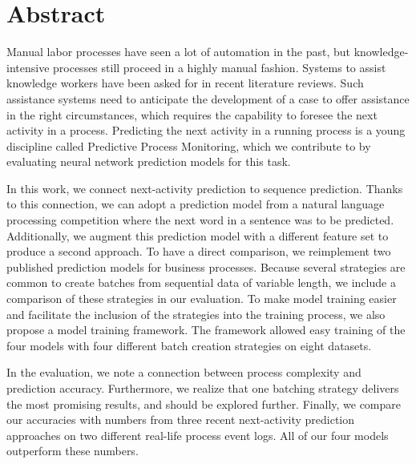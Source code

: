 


\begingroup
\let\clearpage\relax
\let\cleardoublepage\relax
\let\cleardoublepage\relax

\chapter*{Abstract}
Manual labor processes have seen a lot of automation in the past, but knowledge-intensive processes still proceed in a highly manual fashion.
Systems to assist knowledge workers have been asked for in recent literature reviews.
Such assistance systems need to anticipate the development of a case to offer assistance in the right circumstances, which requires the capability to foresee the next activity in a process.
Predicting the next activity in a running process is a young discipline called Predictive Process Monitoring, which we contribute to by evaluating neural network prediction models for this task.

In this work, we connect next-activity prediction to sequence prediction.
Thanks to this connection, we can adopt a prediction model from a natural language processing competition where the next word in a sentence was to be predicted.
Additionally, we augment this prediction model with a different feature set to produce a second approach.
To have a direct comparison, we reimplement two published prediction models for business processes.
Because several strategies are common to create batches from sequential data of variable length, we include a comparison of these strategies in our evaluation.
To make model training easier and facilitate the inclusion of the strategies into the training process, we also propose a model training framework.
The framework allowed easy training of the four models with four different batch creation strategies on eight datasets.

In the evaluation, we note a connection between process complexity and prediction accuracy.
Furthermore, we realize that one batching strategy delivers the most promising results, and should be explored further.
Finally, we compare our accuracies with numbers from three recent next-activity prediction approaches on two different real-life process event logs.
All of our four models outperform these numbers.
\newpage
{}
